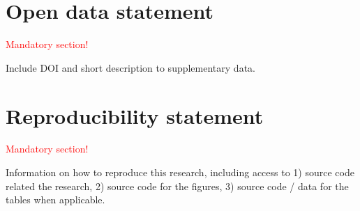 \documentclass[
  manuscript=article,  %
  layout=preprint,  %
  year=20xx,
  volume=x,
]{extra/joas}
\begin{document}
\section*{Open data statement}
\textcolor{red}{Mandatory section!}

Include DOI and short description to supplementary data.

\section*{Reproducibility statement}
\textcolor{red}{Mandatory section!}

Information on how to reproduce this research, including access to 1) source code related the research, 2) source code for the figures, 3) source code / data for the tables when applicable.



\printbibliography
\end{document}

